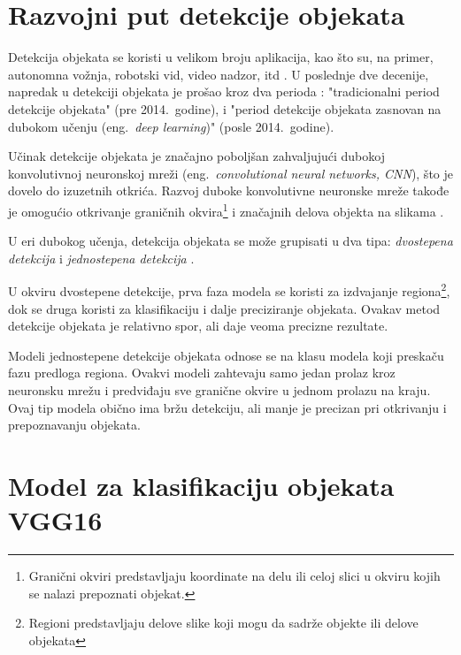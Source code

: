 \documentclass[12pt,oneside]{memoir}
\begin{document}
\section{Razvojni put detekcije objekata}
\label{section2_detekcijaobjekta}


Detekcija objekata se koristi u velikom broju aplikacija, kao što su, na primer, autonomna vožnja, robotski vid, video nadzor, itd \cite{zou2019object}. U poslednje dve decenije, napredak u detekciji objekata je prošao kroz dva perioda \cite{zou2019object}: "tradicionalni period detekcije objekata" (pre 2014.~godine), i "period detekcije objekata zasnovan na dubokom učenju (eng.~\textit{deep learning})" (posle 2014.~godine).


Učinak detekcije objekata je značajno poboljšan zahvaljujući dubokoj konvolutivnoj neuronskoj mreži (eng.~\textit{convolutional neural networks, CNN}), što je dovelo do izuzetnih otkrića.
Razvoj duboke konvolutivne neuronske mreže takođe je omogućio otkrivanje graničnih okvira\footnote{Granični okviri predstavljaju koordinate na delu ili celoj slici u okviru kojih se nalazi prepoznati objekat.} i značajnih delova objekta na slikama \cite{girshick2014rich, ren2015faster, kang2017t, amit2020object}.


U eri dubokog učenja, detekcija objekata se može grupisati u dva tipa: \textit{dvostepena detekcija} i \textit{jednostepena detekcija}  \cite{zou2019object}.

U okviru dvostepene detekcije, prva faza modela se koristi za izdvajanje regiona\footnote{Regioni predstavljaju delove slike koji mogu da sadrže objekte ili delove objekata}, dok se druga koristi za klasifikaciju i dalje preciziranje objekata. Ovakav metod detekcije objekata je relativno spor, ali daje veoma precizne rezultate.

Modeli jednostepene detekcije objekata odnose se na klasu modela koji preskaču fazu predloga regiona. Ovakvi modeli zahtevaju samo jedan prolaz kroz neuronsku mrežu i predviđaju sve granične okvire u jednom prolazu na kraju. Ovaj tip modela obično ima bržu detekciju, ali manje je precizan pri otkrivanju i prepoznavanju objekata.


\section{Model za klasifikaciju objekata VGG16}
\end{document}
